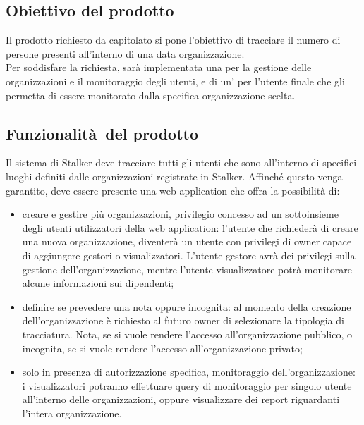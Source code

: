 \documentclass[../analisi-dei-requisiti.tex]{subfiles}
\begin{document}
\subsection{Obiettivo del prodotto}%
\label{sub:obiettivo_del_prodotto}
Il prodotto richiesto da capitolato si pone l'obiettivo di tracciare il numero di persone presenti all’interno di una data organizzazione.\\
Per soddisfare la richiesta, sarà implementata una  per la gestione delle organizzazioni e il monitoraggio degli utenti, e
di un' per l'utente finale che gli permetta di essere monitorato dalla specifica organizzazione scelta.


\subsection{Funzionalità del prodotto}%
\label{sub:funzionalita_del_prodotto}
Il sistema di Stalker deve tracciare tutti gli utenti che sono all'interno di specifici luoghi definiti dalle organizzazioni registrate in Stalker.
Affinché questo venga garantito, deve essere presente una web application che offra la possibilità di:
\begin{itemize}
  \item creare e gestire più organizzazioni, privilegio concesso ad un sottoinsieme degli utenti utilizzatori della web application: l'utente che richiederà di creare una nuova organizzazione,
  diventerà un utente con privilegi di owner capace di aggiungere gestori o visualizzatori. L'utente gestore avrà dei privilegi sulla gestione dell'organizzazione, mentre l'utente visualizzatore
  potrà monitorare alcune informazioni sui dipendenti;
  \item definire se prevedere una  nota oppure incognita: al momento della creazione dell'organizzazione è richiesto al futuro owner di
  selezionare la tipologia di tracciatura. Nota, se si vuole rendere l'accesso all'organizzazione pubblico, o incognita, se si vuole rendere l'accesso all'organizzazione privato;
  \item solo in presenza di autorizzazione specifica, monitoraggio dell'organizzazione: i visualizzatori potranno effettuare query di monitoraggio per singolo utente all’interno
   delle organizzazioni, oppure visualizzare dei report riguardanti l'intera organizzazione.
\end{itemize}
\end{document}
